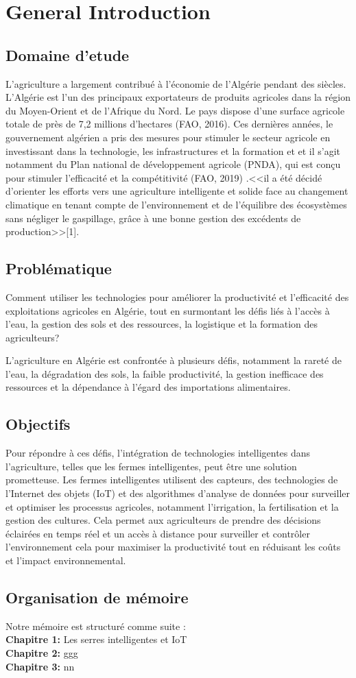 \chapter*{General Introduction} 
\label{chap:introduction} 


\section*{Domaine d'etude}

L'agriculture a largement contribué à l'économie de l'Algérie pendant des siècles. L'Algérie est l'un des principaux exportateurs de produits agricoles dans la région du Moyen-Orient et de l'Afrique du Nord. Le pays dispose d'une surface agricole totale de près de 7,2 millions d'hectares  (FAO, 2016).
Ces dernières années, le gouvernement algérien a pris des mesures pour stimuler le secteur agricole en investissant dans la technologie, les infrastructures et la formation et et il s'agit notamment du Plan national de développement agricole (PNDA), qui est conçu pour stimuler l'efficacité et la compétitivité (FAO, 2019) .<<il a été décidé d’orienter les efforts vers une agriculture intelligente et solide face au changement climatique en tenant compte de l’environnement et de l’équilibre des écosystèmes sans négliger le gaspillage, grâce à une bonne gestion des excédents de production>>[1].


\section*{Problématique }
Comment utiliser les technologies pour améliorer la productivité et l'efficacité des exploitations agricoles en Algérie, tout en surmontant les défis liés à l'accès à l'eau, la gestion des sols et des ressources, la logistique et la formation des agriculteurs?

L'agriculture en Algérie est confrontée à plusieurs défis, notamment la rareté de l'eau, la dégradation des sols, la faible productivité, la gestion inefficace des ressources et la dépendance à l'égard des importations alimentaires. 

\section*{Objectifs }
Pour répondre à ces défis, l'intégration de technologies intelligentes dans l'agriculture, telles que les fermes intelligentes, peut être une solution prometteuse. Les fermes intelligentes utilisent des capteurs, des technologies de l'Internet des objets (IoT) et des algorithmes d'analyse de données pour surveiller et optimiser les processus agricoles, notamment l'irrigation, la fertilisation et la gestion des cultures. Cela permet aux agriculteurs de prendre des décisions éclairées en temps réel et un accès à distance pour surveiller et contrôler l’environnement cela pour maximiser la productivité tout en réduisant les coûts et l'impact environnemental.


\section*{Organisation de mémoire }
Notre mémoire est structuré comme suite : 
\\
\textbf{Chapitre 1: }
Les serres intelligentes et IoT
\\
\textbf{Chapitre 2: }
ggg
\\
\textbf{Chapitre 3: }
nn